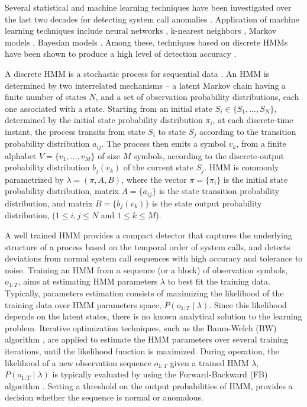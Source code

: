 Several statistical and machine learning techniques have been investigated over the last two decades for detecting system call anomalies \cite{Forrest2008}.
Application of machine learning techniques include neural networks \cite{Ghosh1999}, k-nearest neighbors \cite{Liao2002}, Markov models \cite{Jha2001,Marceau2000}, Bayesian models \cite{Kruegel2003a}.
Among these, techniques based on discrete HMMs have been shown to produce a high level of detection accuracy \cite{Warrender1999,Gao2002,Gao2003,Zhang2003,Du2004,Wang2004,Hoang2004,Khreich2009-ICC,Chen2009,Hu2010,Wang2010}.

A discrete HMM is a stochastic process for sequential data \cite{Khreich2012-INS,Rabiner1989}.
An HMM is determined by two interrelated mechanisms -- a latent Markov chain having a finite number of states $N$, and a set of observation probability distributions, each one associated with a state.
 Starting from an initial state $S_{i}\in\{S_{1},...,S_{N}\}$, determined by the initial state probability distribution $\pi_{i}$, at each discrete-time instant, the process transits from state $S_{i}$ to state $S_{j}$ according to the transition probability distribution $a_{ij}$.
The process then emits a symbol $v_{k}$, from a finite alphabet $V=\{v_{1},\ldots,v_{M}\}$ of size $M$ symbols, according to the discrete-output probability distribution $b_{j}(v_{k})$ of the current state $S_{j}$.
HMM is commonly parametrized by $\lambda=(\pi,A,B)$, where the vector $\pi=\{\pi_{i}\}$ is the initial state probability distribution, matrix $A=\{a_{ij}\}$ is the state transition probability distribution, and matrix $B=\{b_{j}(v_{k})\}$ is the state output probability distribution, ($1\leq i,j\leq N$ and $1\leq k\leq M$).

A well trained HMM provides a compact detector that captures the underlying structure of a process based on the temporal order of system calls, and detects deviations from normal system call sequences with high accuracy and tolerance to noise.
Training an HMM from a sequence (or a block) of observation symbols, $o_{1:T}$, aims at estimating HMM parameters $\lambda$ to best fit the training data.
 Typically, parameters estimation consists of maximizing the likelihood of the training data over HMM parameters space, $P(o_{1:T}\mid\lambda)$.
Since this likelihood depends on the latent states, there is no known analytical solution to the learning problem.
Iterative optimization techniques, such as the Baum-Welch (BW) algorithm \cite{Baum1970}, are applied to estimate the HMM parameters over several training iterations, until the likelihood function is maximized.
During operation, the likelihood of a new observation sequence $o_{1:T}$ given a trained HMM $\lambda$, $P(o_{1:T}\mid\lambda)$ is typically evaluated by using the Forward-Backward (FB) algorithm \cite{Khreich2012-INS,Rabiner1989}.
Setting a threshold on the output probabilities of HMM, provides a decision whether the sequence is normal or anomalous.


